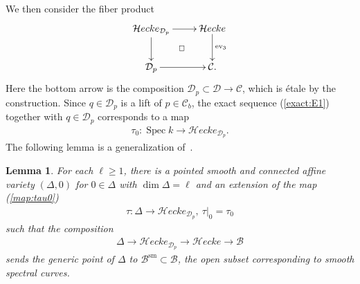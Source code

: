 \documentclass[11pt,oneside,a4paper,mathscr]{amsart}
\makeatletter
\newtheorem{lemma}[thm]{Lemma}
\theoremstyle{definition}
\renewcommand{\geq}{\geqslant}
\newcommand{\cB}{\mathcal{B}}
\newcommand{\cC}{\mathcal{C}}
\newcommand{\cD}{\mathcal{D}}
\newcommand{\ev}{\mathrm{ev}}
\newcommand{\diasquare}{\ar@{}[rd]|\square}
\newcommand{\cHecke}{\mathcal{H}ecke}
\newcommand{\Spec}{\operatorname{Spec}}
\makeatother
\begin{document}
We then consider the fiber product 
\begin{align}\label{dia:heckeD}
    \xymatrix{
    \cHecke_{\cD_p} \ar[r] \ar[d] \diasquare & \cHecke \ar[d]^-{\ev_3} \\
    \cD_p \ar[r] & \cC.
    }
\end{align}
Here the bottom arrow is the composition $\cD_p \subset \cD \to \cC$, which is \'{e}tale 
by the construction. 
Since $q\in \cD_p$ is a lift of $p\in \cC_b$, the exact sequence (\ref{exact:E1}) 
together with $q\in \cD_p$ 
corresponds to a map 
\begin{align}\label{map:tau0}
    \tau_0 \colon \Spec k \to \cHecke_{\cD_p}.
\end{align}
The following lemma is a generalization of~\cite[Lemma~5.3]{TodaGL2}.
\begin{lemma}\label{lem:Delta}
For each $\ell \geq 1$, there is a pointed smooth and connected affine variety 
    $(\Delta, 0)$ for $0\in \Delta$ with $\dim \Delta=\ell$ and an extension of the map (\ref{map:tau0})
    \begin{align}\label{map:Delta}
        \tau \colon \Delta \to \cHecke_{\cD_p}, \ \tau|_{0}=\tau_0
    \end{align}
    such that the composition 
    \begin{align}\label{map:DeltaB}
\Delta \to \cHecke_{\cD_p} \to \cHecke \to \cB
    \end{align}
    sends the generic point of $\Delta$ to $\cB^{\mathrm{sm}} \subset \cB$, the open 
    subset corresponding to smooth spectral curves. 
\end{lemma}
\end{document}

